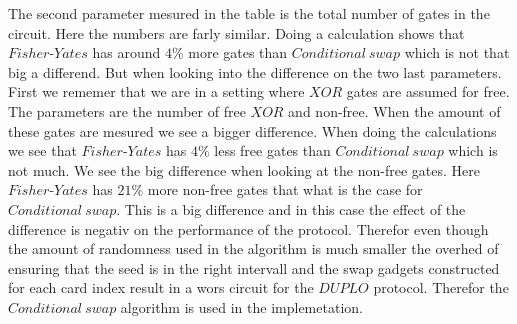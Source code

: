 
The second parameter mesured in the table is the total number of gates in the circuit. Here the numbers are farly similar. Doing a calculation shows that $Fisher\text{-}Yates$ has around $4\%$ more gates than $Conditional~swap$ which is not that big a differend. But when looking into the difference on the two last parameters. First we rememer that we are in a setting where $XOR$ gates are assumed for free. The parameters are the number of free $XOR$ and non-free. When the amount of these gates are mesured we see a bigger difference. When doing the calculations we see that $Fisher\text{-}Yates$ has $4\%$ less free gates than $Conditional~swap$ which is not much. We see the big difference when looking at the non-free gates. Here $Fisher\text{-}Yates$ has $21\%$ more non-free gates that what is the case for $Conditional~swap$. This is a big difference and in this case the effect of the difference is negativ on the performance of the protocol. Therefor even though the amount of randomness used in the algorithm is much smaller the overhed of ensuring that the seed is in the right intervall and the swap gadgets constructed for each card index result in a wors circuit for the $DUPLO$ protocol. Therefor the $Conditional~swap$ algorithm is used in the implemetation.